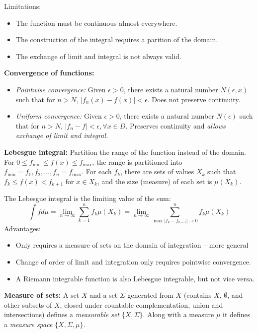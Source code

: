 \documentclass[12pt]{article}
\begin{document}
Limitations:
\begin{itemize}
    \item The function must be continuous almost everywhere.
    \item The construction of the integral requires a parition of the domain.
    \item The exchange of limit and integral is not always valid.
\end{itemize}

\textbf{Convergence of functions:}
\begin{itemize}
    \item \textit{Pointwise convergence:} Given $\epsilon > 0$, there exists a natural number $N(\epsilon, x)$ such that for $n > N$, $|f_n(x) - f(x)| < \epsilon$. Does not preserve continuity.
    \item \textit{Uniform convergence:} Given $\epsilon > 0$, there exists a natural number $N(\epsilon)$ such that for $n > N$, $|f_n - f| < \epsilon, \forall x \in D$. Preserves continuity and \textit{allows exchange of limit and integral.}
\end{itemize}

\textbf{Lebesgue integral:} Partition the range of the function instead of the domain. For $0 \leq f_\text{min} \leq f(x) \leq f_\text{max}$, the range is partitioned into $f_\text{min} = f_1, f_2, \dots, f_n = f_\text{max}$. For each $f_k$, there are sets of values $X_k$ such that $f_k \leq f(x) < f_{k+1}$ for $x \in X_k$, and the size (measure) of each set is $\mu(X_k)$.

The Lebesgue integral is the limiting value of the sum:
$$\int f d\mu = \lim_{n \to \infty} \sum_{k=1}^n f_k \mu(X_k) = \lim_{n \to \infty} \sum_{\max |f_k - f_{k-1}| \to 0}^n f_k \mu(X_k)$$
Advantages:
\begin{itemize}
    \item Only requires a measure of sets on the domain of integration -- more general
    \item Change of order of limit and integration only requires pointwise convergence.
    \item A Riemann integrable function is also Lebesgue integrable, but not vice versa.
\end{itemize}

\textbf{Measure of sets:} A set $X$ and a set $\Sigma$ generated from $X$ (contains $X$, $\emptyset$, and other subsets of $X$, closed under countable complementation, union and intersections) defines a \textit{measurable set} $\{X, \Sigma\}$. Along with a measure $\mu$ it defines a \textit{measure space} $\{X, \Sigma, \mu\}$.
\end{document}
